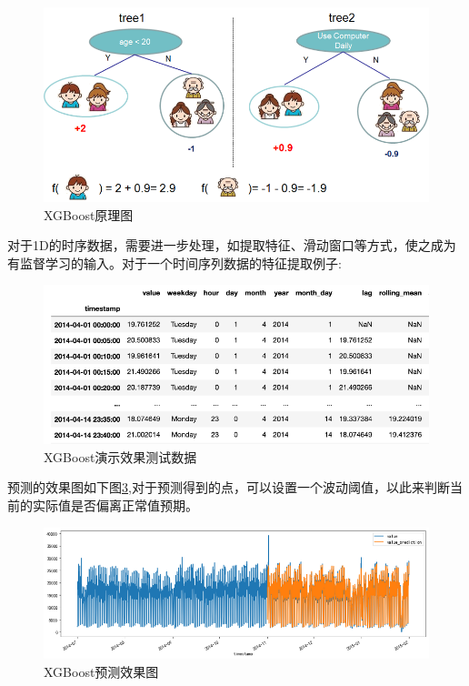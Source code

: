 \begin{figure}[htbp]
  \centering
  \includegraphics[scale=0.8]{figure/chapter4/XGBoost原理图.png}
  \caption{XGBoost原理图}\label{xgboostyuanli}
\end{figure}
\newpage
对于1D的时序数据，需要进一步处理，如提取特征、滑动窗口等方式，使之成为有监督学习的输入。对于一个时间序列数据的特征提取例子:
    \begin{figure}[htbp]
  \centering
  \includegraphics[scale=0.8]{figure/chapter4/XGBoost演示效果测试数据.png}
  \caption{XGBoost演示效果测试数据}\label{xgboostxiaoguceshiju}
\end{figure}

预测的效果图如下图\ref{xgboostxiaoguo},对于预测得到的点，可以设置一个波动阈值，以此来判断当前的实际值是否偏离正常值预期。
    \begin{figure}[htbp]
  \centering
  \includegraphics[scale=0.8]{figure/chapter4/XGBoost预测效果图.png}
  \caption{XGBoost预测效果图}\label{xgboostxiaoguo}
\end{figure}
\newpage
